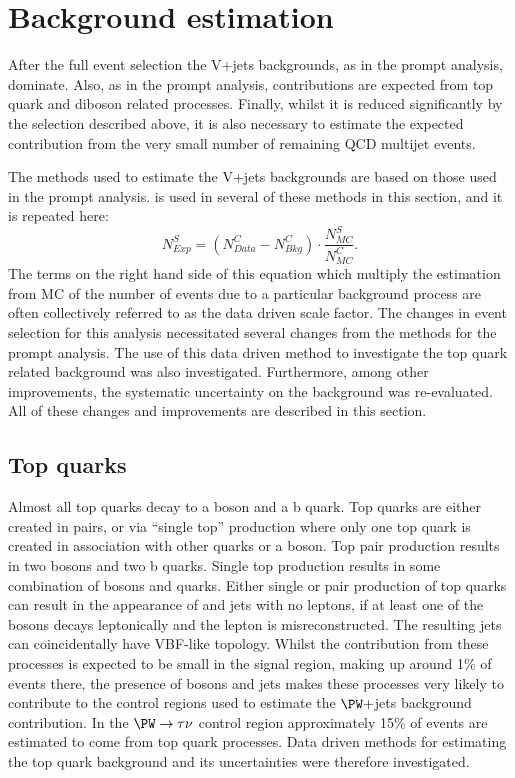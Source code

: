 \section{Background estimation}                                                                                                                          
\label{sec:parkedbkg}
After the full event selection the V+jets backgrounds, as in the prompt analysis, dominate. Also, as in the prompt analysis, contributions are expected from top quark and diboson related processes. Finally, whilst it is reduced significantly by the selection described above, it is also necessary to estimate the expected contribution from the very small number of remaining \ac{QCD} multijet events.

The methods used to estimate the V+jets backgrounds are based on those used in the prompt analysis.  is used in several of these methods in this section, and it is repeated here:
\begin{equation}
  \label{eq:wdatabkgrep}
  N^{S}_{Exp}=\left(N^{C}_{Data}-N^{C}_{Bkg}\right)\cdot\frac{N^{S}_{MC}}{N^{C}_{MC}}.
\end{equation}
The terms on the right hand side of this equation which multiply the estimation from \ac{MC} of the number of events due to a particular background process are often collectively referred to as the data driven scale factor. The changes in event selection for this analysis necessitated several changes from the methods for the prompt analysis. The use of this data driven method to investigate the top quark related background was also investigated. Furthermore, among other improvements, the systematic uncertainty on the \Znunu background was re-evaluated. All of these changes and improvements are described in this section.

\subsection{Top quarks}
\label{sec:parkedtop}
Almost all top quarks decay to a \PW boson and a b quark. Top quarks are either created in pairs, or via ``single top'' production where only one top quark is created in association with  other quarks or a \PW boson. Top pair production results in two \PW bosons and two b quarks. Single top production results in some combination of \PW bosons and quarks. Either single or pair production of top quarks can result in the appearance of \MET and jets with no leptons, if at least one of the \PW bosons decays leptonically and the lepton is misreconstructed. The resulting jets can coincidentally have \ac{VBF}-like topology. Whilst the contribution from these processes is expected to be small in the signal region, making up around 1\% of events there, the presence of \PW bosons and jets makes these processes very likely to contribute to the control regions used to estimate the $\PW+$jets background contribution. In the $\PW\rightarrow\tau\nu$ control region approximately 15\% of events are estimated to come from top quark processes. Data driven methods for estimating the top quark background and its uncertainties were therefore investigated.

